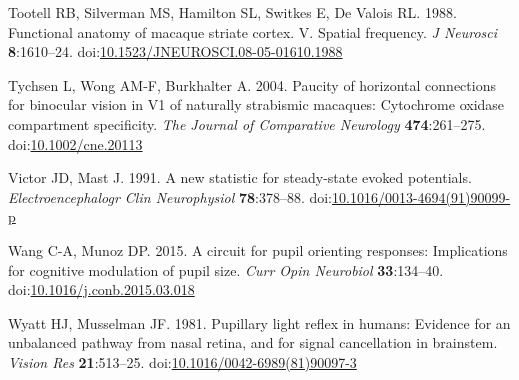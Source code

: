 \documentclass[
]{article}
\newlength{\cslhangindent}
\newlength{\cslentryspacingunit} %
\newenvironment{CSLReferences}[2] %
 {%
  \setlength{\parindent}{0pt}
  \ifodd #1
  \let\oldpar\par
  \def\par{\hangindent=\cslhangindent\oldpar}
  \fi
  \setlength{\parskip}{#2\cslentryspacingunit}
 }%
 {}
\begin{document}
\begin{CSLReferences}{1}{0}
\leavevmode{}%
Tootell RB, Silverman MS, Hamilton SL, Switkes E, De Valois RL. 1988. Functional anatomy of macaque striate cortex. V. Spatial frequency. \emph{J Neurosci} \textbf{8}:1610--24. doi:\href{https://doi.org/10.1523/JNEUROSCI.08-05-01610.1988}{10.1523/JNEUROSCI.08-05-01610.1988}

\leavevmode{}%
Tychsen L, Wong AM-F, Burkhalter A. 2004. Paucity of horizontal connections for binocular vision in V1 of naturally strabismic macaques: Cytochrome oxidase compartment specificity. \emph{The Journal of Comparative Neurology} \textbf{474}:261--275. doi:\href{https://doi.org/10.1002/cne.20113}{10.1002/cne.20113}

\leavevmode{}%
Victor JD, Mast J. 1991. A new statistic for steady-state evoked potentials. \emph{Electroencephalogr Clin Neurophysiol} \textbf{78}:378--88. doi:\href{https://doi.org/10.1016/0013-4694(91)90099-p}{10.1016/0013-4694(91)90099-p}

\leavevmode{}%
Wang C-A, Munoz DP. 2015. A circuit for pupil orienting responses: Implications for cognitive modulation of pupil size. \emph{Curr Opin Neurobiol} \textbf{33}:134--40. doi:\href{https://doi.org/10.1016/j.conb.2015.03.018}{10.1016/j.conb.2015.03.018}

\leavevmode{}%
Wyatt HJ, Musselman JF. 1981. Pupillary light reflex in humans: Evidence for an unbalanced pathway from nasal retina, and for signal cancellation in brainstem. \emph{Vision Res} \textbf{21}:513--25. doi:\href{https://doi.org/10.1016/0042-6989(81)90097-3}{10.1016/0042-6989(81)90097-3}

\end{CSLReferences}
\end{document}
